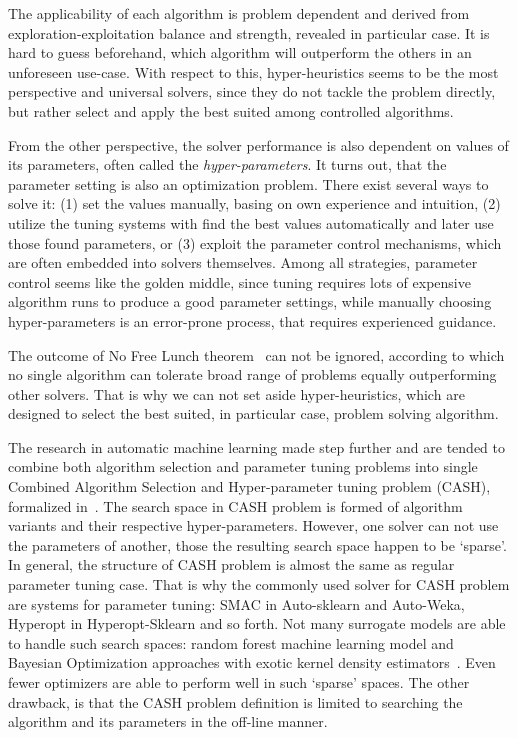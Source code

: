The applicability of each algorithm is problem dependent and derived from exploration-exploitation balance and strength, revealed in particular case.
It is hard to guess beforehand, which algorithm will outperform the others in an unforeseen use-case.
With respect to this, hyper-heuristics seems to be the most perspective and universal solvers, since they do not tackle the problem directly, but rather select and apply the best suited among controlled algorithms.

From the other perspective, the solver performance is also dependent on values of its parameters, often called the \textit{hyper-parameters}.
It turns out, that the parameter setting is also an optimization problem.
There exist several ways to solve it: (1) set the values manually, basing on own experience and intuition, (2) utilize the tuning systems with find the best values automatically and later use those found parameters, or (3) exploit the parameter control mechanisms, which are often embedded into solvers themselves. 
Among all strategies, parameter control seems like the golden middle, since tuning requires lots of expensive algorithm runs to produce a good parameter settings, while manually choosing hyper-parameters is an error-prone process, that requires experienced guidance.

The outcome of No Free Lunch theorem~\cite{wolpert1997no} can not be ignored, according to which no single algorithm can tolerate broad range of problems equally outperforming other solvers. That is why we can not set aside hyper-heuristics, which are designed to select the best suited, in particular case, problem solving algorithm.

The research in automatic machine learning made step further and are tended to combine both algorithm selection and parameter tuning problems into single Combined Algorithm Selection and Hyper-parameter tuning problem (CASH), formalized in~\cite{thornton2013auto}. The search space in CASH problem is formed of algorithm variants and their respective hyper-parameters. However, one solver can not use the parameters of another, those the resulting search space happen to be `sparse'. In general, the structure of CASH problem is almost the same as regular parameter tuning case. That is why the commonly used solver for CASH problem are systems for parameter tuning: SMAC in Auto-sklearn and Auto-Weka, Hyperopt in Hyperopt-Sklearn and so forth.
Not many surrogate models are able to handle such search spaces: random forest machine learning model and Bayesian Optimization approaches with exotic kernel density estimators~\cite{levesque2017bayesian}. Even fewer optimizers are able to perform well in such `sparse' spaces.
The other drawback, is that the CASH problem definition is limited to searching the algorithm and its parameters in the off-line manner.


